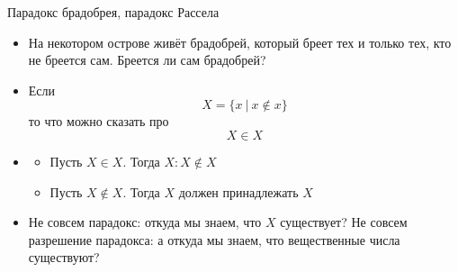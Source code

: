 \documentclass[aspectratio=169]{beamer}
\begin{document}
%

\begin{frame}{Парадокс брадобрея, парадокс Рассела}

\begin{itemize}
\item На некотором острове живёт брадобрей, который бреет тех и только тех, кто не бреется
сам. Бреется ли сам брадобрей? \pause
\item Если
$$X = \{ x \ |\ x \notin x\}$$ \pause
то что можно сказать про
$$X \in X$$ \pause

\item \begin{itemize}
\item Пусть $X \in X$. Тогда $X : X \notin X$\pause
\item Пусть $X \notin X$. Тогда $X$ должен принадлежать $X$\pause
\end{itemize}

\item Не совсем парадокс: откуда мы знаем, что $X$ существует? \pause
Не совсем разрешение парадокса: а откуда мы знаем, что вещественные числа существуют?
\end{itemize}
\end{frame}
\end{document}
